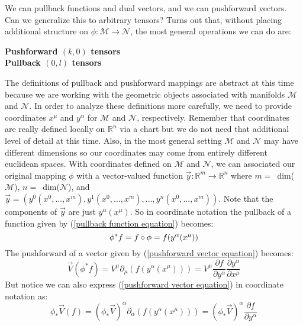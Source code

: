 \documentclass[10pt]{article}
\begin{document}
We can pullback functions and dual vectors, and we can pushforward vectors.  Can we generalize this to arbitrary tensors?  Turns out that, without placing additional structure on $\phi: \mathcal{M} \longrightarrow \mathcal{N}$, the most general operations we can do are: 
\begin{center}
\textbf{Pushforward $(k,0)$ tensors}\\
\textbf{Pullback $(0,l)$ tensors}
 \end{center}
The definitions of pullback and pushforward mappings are abstract at this time because we are working with the geometric objects associated with manifolds $\mathcal{M}$ and $\mathcal{N}$. In order to analyze these definitions more carefully, we need to provide coordinates $x^\mu$ and $y^\alpha$ for $\mathcal{M}$ and $\mathcal{N}$, respectively.  Remember that coordinates are really defined locally on $\mathbb{R}^n$ via a chart but we do not need that additional level of detail at this time. Also, in the most general setting $\mathcal{M}$ and $\mathcal{N}$ may have different dimensions so our coordinates may come from entirely different euclidean spaces.
With coordinates defined on $\mathcal{M}$ and $\mathcal{N}$, we can associated our original mapping $\phi$ with a vector-valued function $\vec y:\mathbb{R}^m \longrightarrow \mathbb{R}^n$ where $m=$\ dim($\mathcal{M}$), $n= $\ dim($\mathcal{N}$), and $\vec y=(y^0 (x^0,...,x^m),y^1 (x^0,...,x^m),...,y^n(x^0,...,x^m))$.  Note that the components of $\vec y$ are just $y^\alpha (x^\mu)$. So in coordinate notation the pullback of a function given by (\ref {pullback function equation}) becomes:
\begin{equation}
\label{pullback function components}
   \phi^\ast f = f\circ \phi = f(y^\alpha(x^\mu))\\
\end{equation} 
The pushforward of a vector given by (\ref {pushforward vector equation}) becomes:
\begin{equation}
\label{pushforward vector components1}
    \vec V (\phi^\ast f)=V^\mu \partial_\mu (f(y^\alpha(x^\mu)))=V^\mu \frac{\partial f}{\partial y^\alpha} \frac{\partial y^\alpha}{\partial x^\mu}
\end{equation} 
But notice we can also express (\ref {pushforward vector equation}) in coordinate notation as:
\begin{equation}
\label{pushforward vector components2}
   \phi_\ast \vec V (f)= (\phi_\ast \vec V)^\alpha \partial_\alpha (f(y^\alpha(x^\mu)))= (\phi_\ast \vec V)^\alpha  \frac{\partial f}{\partial y^\alpha}
\end{equation}
\end{document}
